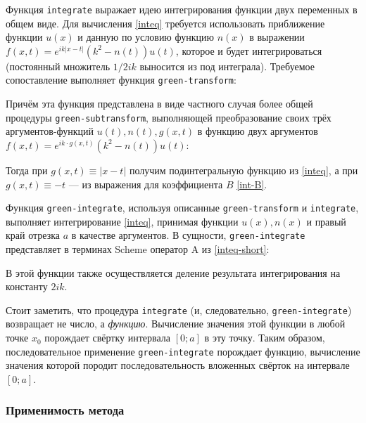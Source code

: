 \documentclass{article}
\newcommand{\procname}[1]{\texttt{#1}}
\providecommand{\abs}[1]{\left \lvert{#1}\right \rvert}
\providecommand{\op}[1]{\mathrm{#1}}
\numberwithin{equation}{section}
\begin{document}


Функция \procname{integrate} выражает идею интегрирования функции двух
переменных в общем виде. Для вычисления \eqref{inteq} требуется
использовать приближение функции $u(x)$ и данную по условию функцию
$n(x)$ в выражении $f(x,t) = e^{ik|x-t|}(k^2-n(t))u(t)$, которое и
будет интегрироваться (постоянный множитель $1/2ik$ выносится из под
интеграла). Требуемое сопоставление выполняет функция
\procname{green-transform}:



Причём эта функция представлена в виде частного случая более общей
процедуры \procname{green-subtransform}, выполняющей преобразование
своих трёх аргументов-функций $u(t), n(t), g(x, t)$ в функцию двух
аргументов $f(x,t) = e^{ik \cdot g(x, t)}(k^2-n(t))u(t)$:



Тогда при $g(x, t) \equiv \abs{x-t}$ получим подинтегральную функцию
из \eqref{inteq}, а при $g(x, t) \equiv -t$ — из выражения для
коэффициента $B$ \eqref{int-B}.

Функция \procname{green-integrate}, используя описанные
\procname{green-transform} и \procname{integrate}, выполняет
интегрирование \eqref{inteq}, принимая функции $u(x), n(x)$ и правый
край отрезка $a$ в качестве аргументов. В сущности,
\procname{green-integrate} представляет в терминах Scheme оператор
$\op{A}$ из \eqref{inteq-short}:



В этой функции также осуществляется деление результата интегрирования
на константу $2ik$.

Стоит заметить, что процедура \procname{integrate} (и, следовательно,
\procname{green-integrate}) возвращает не число, а
\emph{функцию}. Вычисление значения этой функции в любой точке $x_0$
порождает свёртку интервала $[0; a]$ в эту точку. Таким образом,
последовательное применение \procname{green-integrate} порождает
функцию, вычисление значения которой породит последовательность
вложенных свёрток на интервале $[0; a]$.

\subsubsection{Применимость метода}
\label{iter-converge}
\end{document}
